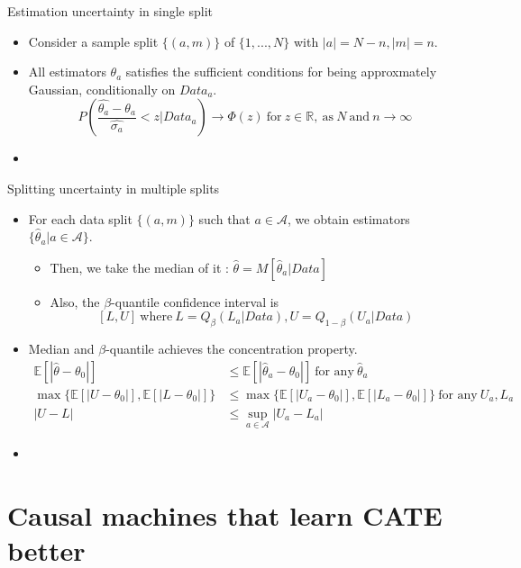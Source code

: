 \documentclass[xcolor=svgnames,aspectratio=169]{beamer}
\newcommand{\R}{\mathbb{R}}
\newcommand{\E}{\mathbb{E}}
\begin{document}
\begin{frame}{Estimation uncertainty in single split}
    \begin{itemize}
        \item Consider a sample split $\{(a,m)\}$ of $\{1,...,N\}$ with $|a|=N-n, |m|=n$.
        \item All estimators $\theta_a$ satisfies the sufficient conditions for being approxmately Gaussian, conditionally on $Data_a$.
        \[
        P(\frac{\hat{\theta_a}-\theta_a}{\hat{\sigma_a}}<z|Data_a) \to \Phi(z) \ \text{for} \ z\in\R, \ \text{as} \ N \ \text{and} \ n\to\infty
        \]
        \item 
    \end{itemize}
\end{frame}

\begin{frame}{Splitting uncertainty in multiple splits}
    \begin{itemize}
        \item For each data split $\{(a,m)\}$ such that $a\in \mathcal{A} $, we obtain estimators $\{\hat{\theta}_a|a\in\mathcal{A} \}$.
        \begin{itemize}
            \item Then, we take the median of it : $\hat{\theta}=M[\hat{\theta}_a|Data]$
            \item Also, the $\beta$-quantile confidence interval is 
            \[
            [L,U] \  \text{where} \ L=Q_{\beta}(L_a|Data), U=Q_{1-\beta}(U_a|Data)
            \]
        \end{itemize}
        \item Median and $\beta$-quantile achieves the \alert{concentration} property.
        \begin{align*}
            \E[|\hat{\theta}-\theta_0|]&\leq \E[|\hat{\theta}_a-\theta_0|] \ \text{for any} \ \hat{\theta}_a \\
            \max\{\E[|U-\theta_0|], \E[|L-\theta_0|]\}&\leq \max\{\E[|U_a-\theta_0|], \E[|L_a-\theta_0|]\} \ \text{for any} \ U_a, L_a \\
            |U-L|&\leq \sup_{a\in\mathcal{A} }|U_a-L_a|
        \end{align*}
        \item 
    \end{itemize}
\end{frame}

\section{Causal machines that learn CATE better}
\end{document}
